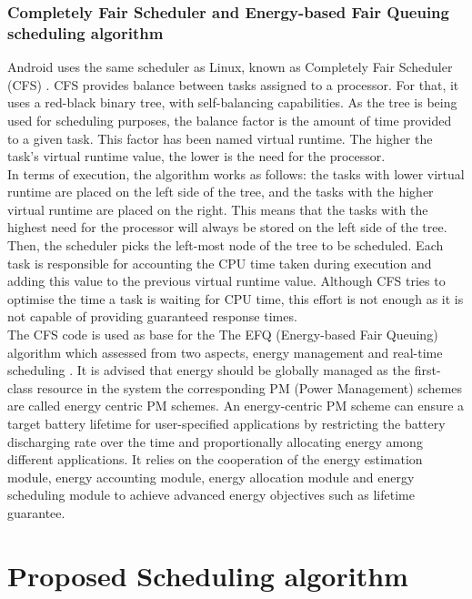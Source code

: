 \documentclass[conference]{IEEEtran}
\begin{document}
\subsubsection{Completely Fair Scheduler and Energy-based Fair Queuing scheduling algorithm}

Android uses the same scheduler as Linux, known as Completely Fair Scheduler (CFS) \cite{ANDR01}. CFS provides balance between tasks assigned to a processor. For that, it uses a red-black binary tree,  with self-balancing capabilities.  As the tree is being used for scheduling purposes, the balance factor is the amount of time provided to a given task. This
factor has been named virtual runtime. The higher the task’s virtual runtime value, the lower is the need for the processor.\\
In terms of execution, the algorithm works as follows: the tasks with lower virtual runtime are placed on the left side of the tree, and the tasks with the higher virtual runtime are placed on the right. This means that the tasks with the highest need for the processor will always be  stored on the left side of the tree. Then, the scheduler picks the left-most
node of the tree to be scheduled. Each task is responsible for accounting the CPU time taken during execution and adding this value to the previous virtual runtime value. Although CFS tries to optimise the time a task is waiting for CPU time, this effort is not enough as it is not capable of providing guaranteed response times. \\

The CFS code is used as base for the The EFQ (Energy-based Fair Queuing) algorithm which assessed from two aspects, energy management and real-time scheduling \cite{WEI01}. 
It is advised that energy should be globally managed as the first-class resource in the system  the corresponding PM (Power Management) schemes are called energy centric PM schemes. An energy-centric PM scheme can ensure a target battery lifetime for user-specified applications by restricting the battery discharging rate over the time and proportionally allocating energy among different applications.  It relies on the cooperation of the energy estimation module, energy accounting module, energy allocation module and energy scheduling module to achieve advanced energy objectives such as lifetime guarantee.\\


\section{Proposed Scheduling algorithm}
\end{document}
